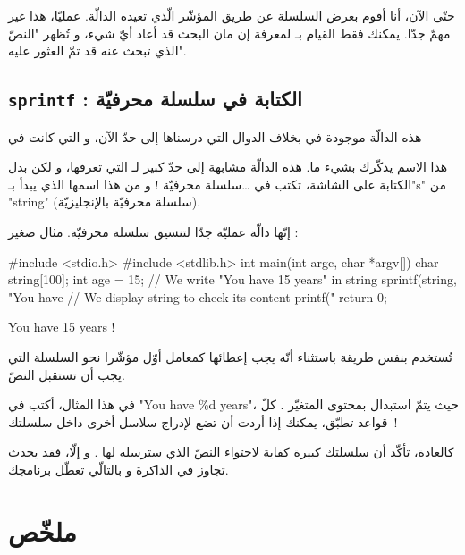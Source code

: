 حتّى الآن، أنا أقوم بعرض السلسلة عن طريق المؤشّر الّذي تعيده الدالّة. عمليّا، هذا غير مهمّ جدّا. يمكنك فقط القيام بـ
لمعرفة إن مان البحث قد أعاد أيّ شيء، و تُظهر "النصّ الذي تبحث عنه قد تمّ العثور عليه".

\subsection{\texttt{sprintf} : الكتابة في سلسلة محرفيّة}

\begin{information}
  هذه الدالّة موجودة في
  بخلاف الدوال التي درسناها إلى حدّ الآن، و التي كانت في
\end{information}

هذا الاسم يذكّرك بشيء ما. هذه الدالّة مشابهة إلى حدّ كبير لـ
التي تعرفها، و لكن بدل الكتابة على الشاشة،
تكتب في \dots سلسلة محرفيّة ! و من هذا اسمها الذي يبدأ بـ"\textenglish{s}" من "\textenglish{string}" (سلسلة محرفيّة بالإنجليزيّة).

إنّها دالّة عمليّة جدّا لتنسيق سلسلة محرفيّة. مثال صغير :

\begin{Csource}
#include <stdio.h>
#include <stdlib.h>
int main(int argc, char *argv[])
{
	char string[100];
	int age = 15;
	// We write "You have 15 years" in string
	sprintf(string, "You have %
	// We display string to check its content
	printf("%
	return 0;
}
\end{Csource}

\begin{Console}
You have 15 years !
\end{Console}

تُستخدم بنفس طريقة
باستثناء أنّه يجب إعطائها كمعامل أوّل مؤشّرا نحو السلسلة التي يجب أن تستقبل النصّ.

في هذا المثال، أكتب في
"\textenglish{You have \%d years}"،
حيث يتمّ استبدال
بمحتوى المتغيّر
.
كلّ قواعد
تطبّق، يمكنك إذا أردت أن تضع
لإدراج سلاسل أخرى داخل سلسلتك~!

كالعادة، تأكّد أن سلسلتك كبيرة كفاية لاحتواء النصّ الذي سترسله لها
.
و إلّا، فقد يحدث تجاوز في الذاكرة و بالتالّي تعطّل برنامجك.

\section*{ملخّص}

